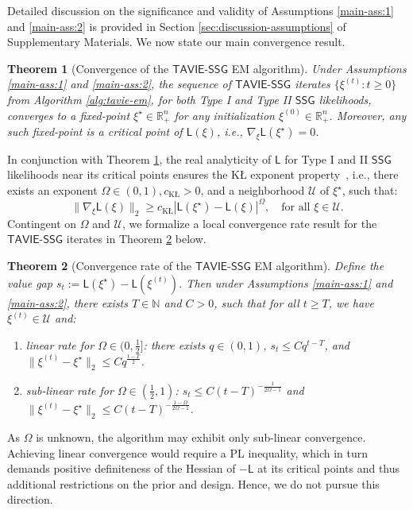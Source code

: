 \documentclass[12pt]{article}
\newtheorem{theorem}{Theorem}
\numberwithin{equation}{section}
\newcommand{\ssg}{\mathsf{SSG}}
\newcommand{\tssg}{\mathsf{TAVIE}\text{-}\mathsf{SSG}}
\begin{document}
Detailed discussion on the significance and validity of Assumptions \ref{main-ass:1} and \ref{main-ass:2} is provided in Section \ref{sec:discussion-assumptions} of Supplementary Materials. We now state our main convergence result.

\begin{theorem}[Convergence of the $\tssg$ EM algorithm]
\label{theorem:convergence}
Under Assumptions \ref{main-ass:1} and \ref{main-ass:2}, the sequence of $\tssg$ iterates $\{\xi^{(t)}: t\geq 0\}$ from Algorithm \ref{alg:tavie-em}, for both Type I and Type II $\ssg$ likelihoods, converges to a fixed-point $\xi^{\star} \in \mathbb{R}^{n}_{+}$ for any initialization $\xi^{(0)} \in \mathbb{R}_{+}^{n}$. Moreover, any such fixed-point is a critical point of $\mathsf{L}(\xi)$, i.e., $\nabla_{\xi}\mathsf{L}(\xi^\star) = 0$.
\end{theorem}
%
In conjunction with Theorem \ref{theorem:convergence}, the real analyticity of $\mathsf{L}$ for Type I and II $\ssg$ likelihoods near its critical points ensures the K\L{} exponent property~\citep{KL-SIAM-1,bolte2014proximal}, i.e., there exists an exponent $\Omega \in (0, 1), c_{\mathrm{K\text{\L}}} > 0$, and a neighborhood $\mathcal{U}$ of $\xi^{\star}$, such that:
\begin{equation}\label{eq:KL-exponent}
    \lVert \nabla_{\xi}\mathsf{L}(\xi)\rVert_{2} \geq c_{\mathrm{K\text{\L}}}|\mathsf{L}(\xi^{\star}) - \mathsf{L}(\xi)|^{\Omega},\quad \text{for all }\xi\in \mathcal{U}.
\end{equation}
Contingent on $\Omega$ and $\mathcal{U}$, we formalize a local convergence rate result for the $\tssg$ iterates in Theorem \ref{theorem:convergence-rate} below.

\begin{theorem}[Convergence rate of the $\tssg$ EM algorithm]
\label{theorem:convergence-rate}
Define the value gap $s_t := \mathsf{L}(\xi^{\star}) - \mathsf{L}(\xi^{(t)})$. Then under Assumptions \ref{main-ass:1} and \ref{main-ass:2}, there exists $T\in \mathbb{N}$ and $C>0$, such that for all $t \geq T$, we have $\xi^{(t)}\in \mathcal{U}$ and:
\begin{enumerate}
    \item [i.] linear rate for $\Omega \in (0, \tfrac{1}{2}]$: there exists $q\in (0, 1)$, $s_t \leq C q^{t-T}$, and $\lVert \xi^{(t)} - \xi^{\star}\rVert_{2} \leq C q^{\tfrac{t-T}{2}}$.

    \item [ii.] sub-linear rate for $\Omega \in (\tfrac{1}{2}, 1)$: $s_t \leq C(t-T)^{-\tfrac{1}{2\Omega -1}}$ and $\lVert \xi^{(t)}-\xi^{\star}\rVert_2 \leq C(t-T)^{-\tfrac{1-\Omega}{2\Omega-1}}$.
\end{enumerate}
\end{theorem}
As $\Omega$ is unknown, the algorithm may exhibit only sub-linear convergence. Achieving linear convergence would require a PL inequality, which in turn demands positive definiteness of the Hessian of $-\mathsf{L}$ at its critical points and thus additional restrictions on the prior and design. Hence, we do not pursue this direction.
\end{document}
